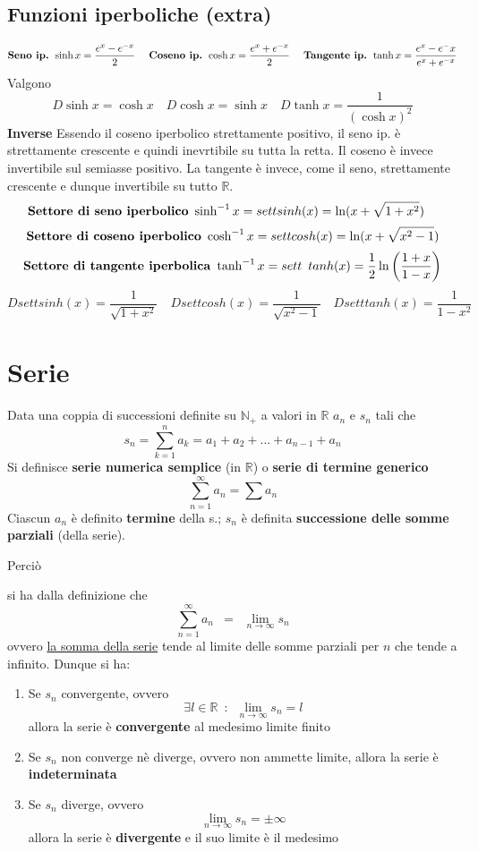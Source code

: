 \documentclass[10pt]{article}
\theoremstyle{plain}
\begin{document}
\subsection{Funzioni iperboliche (extra)}
\[\textrm{\textbf{Seno ip.} } \sinh{x} = \frac{e^x - e^{-x}}{2} \quad \textrm{  \textbf{Coseno ip.} } \cosh{x} = \frac{e^x + e^{-x}}{2} \quad \textrm{  \textbf{Tangente ip.} } \tanh{x} = \frac{e^x - e^-x}{e^x + e^{-x}}\]
Valgono
\[D\sinh{x} = \cosh{x} \quad D\cosh{x} = \sinh{x} \quad D\tanh{x} = \frac{1}{(\cosh{x})^2}\]
\textbf{Inverse} Essendo il coseno iperbolico strettamente positivo, il seno ip. è strettamente crescente e quindi inevrtibile su tutta la retta. Il coseno è invece invertibile sul semiasse positivo. La tangente è invece, come il seno, strettamente crescente e dunque invertibile su tutto $\mathbb{R}$.
\[\textrm{\textbf{Settore di seno iperbolico} } \sinh^{-1}{x} = settsinh (x) = \ln(x + \sqrt{1 + x^2}) \quad \] \[\textrm{\textbf{Settore di coseno iperbolico} } \cosh^{-1}{x} = settcosh (x) = \ln(x + \sqrt{x^2-1})\]
\[\textrm{\textbf{Settore di tangente iperbolica} } \tanh^{-1}{x} =  sett \enspace tanh (x) = \frac{1}{2}\ln\bigg(\frac{1+x}{1-x}\bigg)\]
\[Dsettsinh(x) = \frac{1}{\sqrt{1 + x^2}} \quad Dsettcosh(x) = \frac{1}{\sqrt{x^2-1}} \quad Dsett tanh (x) = \frac{1}{1 - x^2}\]

\section{Serie}
\begin{defin}
Data una coppia di successioni definite su $\mathbb{N}_+$ a valori in $\mathbb{R}$ $a_n$ e $s_n$ tali che
\[s_n = \sum \limits_{k=1}^{n} a_k = a_1 + a_2 + ... + a_{n-1} + a_n\]
Si definisce \textbf{serie numerica semplice} (in $\mathbb{R}$) o \textbf{serie di termine generico}
\[\sum \limits_{n=1}^{\infty} a_n = \sum a_n\]
Ciascun $a_n$ è definito \textbf{termine} della s.; $s_n$ è definita \textbf{successione delle somme parziali} (della serie).
\end{defin}
\hypertarget{sommeparziali}{Perciò} si ha dalla definizione che
\[\sum \limits_{n=1}^{\infty} a_n \enspace = \enspace \lim \limits_{n \rightarrow \infty} s_n\]
ovvero \underline{la somma della serie} tende al limite delle somme parziali per $n$ che tende a infinito. Dunque si ha:
\begin{enumerate}
    \item Se $s_n$ convergente, ovvero \[\exists l \in \mathbb{R} \enspace : \enspace \lim \limits_{n \rightarrow \infty} s_n = l\]
    allora la serie è \textbf{convergente} al medesimo limite finito
    \item Se $s_n$ non converge nè diverge, ovvero non ammette limite, allora la serie è \textbf{indeterminata}
    \item Se $s_n$ diverge, ovvero \[\lim \limits_{n \rightarrow \infty} s_n = \pm \infty\] allora la serie è \textbf{divergente} e il suo limite è il medesimo
\end{enumerate}
\end{document}
